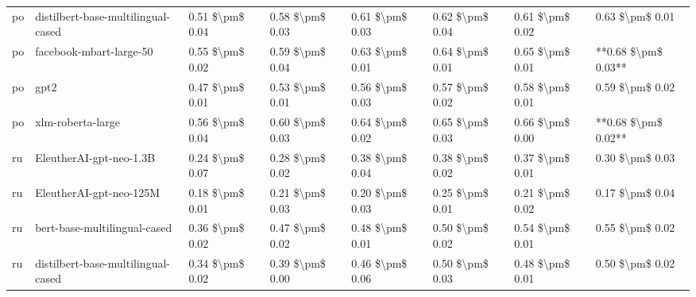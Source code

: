 \begin{tabular}{llllllll}
      po & distilbert-base-multilingual-cased & 0.51 \$\textbackslash pm\$ 0.04 &           0.58 \$\textbackslash pm\$ 0.03 &       0.61 \$\textbackslash pm\$ 0.03 &        0.62 \$\textbackslash pm\$ 0.04 &                         0.61 \$\textbackslash pm\$ 0.02 &     0.63 \$\textbackslash pm\$ 0.01 \\
      po &            facebook-mbart-large-50 & 0.55 \$\textbackslash pm\$ 0.02 &           0.59 \$\textbackslash pm\$ 0.04 &       0.63 \$\textbackslash pm\$ 0.01 &        0.64 \$\textbackslash pm\$ 0.01 &                         0.65 \$\textbackslash pm\$ 0.01 & **0.68 \$\textbackslash pm\$ 0.03** \\
      po &                               gpt2 & 0.47 \$\textbackslash pm\$ 0.01 &           0.53 \$\textbackslash pm\$ 0.01 &       0.56 \$\textbackslash pm\$ 0.03 &        0.57 \$\textbackslash pm\$ 0.02 &                         0.58 \$\textbackslash pm\$ 0.01 &     0.59 \$\textbackslash pm\$ 0.02 \\
      po &                  xlm-roberta-large & 0.56 \$\textbackslash pm\$ 0.04 &           0.60 \$\textbackslash pm\$ 0.03 &       0.64 \$\textbackslash pm\$ 0.02 &        0.65 \$\textbackslash pm\$ 0.03 &                         0.66 \$\textbackslash pm\$ 0.00 & **0.68 \$\textbackslash pm\$ 0.02** \\
      ru &            EleutherAI-gpt-neo-1.3B & 0.24 \$\textbackslash pm\$ 0.07 &           0.28 \$\textbackslash pm\$ 0.02 &       0.38 \$\textbackslash pm\$ 0.04 &        0.38 \$\textbackslash pm\$ 0.02 &                         0.37 \$\textbackslash pm\$ 0.01 &     0.30 \$\textbackslash pm\$ 0.03 \\
      ru &            EleutherAI-gpt-neo-125M & 0.18 \$\textbackslash pm\$ 0.01 &           0.21 \$\textbackslash pm\$ 0.03 &       0.20 \$\textbackslash pm\$ 0.03 &        0.25 \$\textbackslash pm\$ 0.01 &                         0.21 \$\textbackslash pm\$ 0.02 &     0.17 \$\textbackslash pm\$ 0.04 \\
      ru &       bert-base-multilingual-cased & 0.36 \$\textbackslash pm\$ 0.02 &           0.47 \$\textbackslash pm\$ 0.02 &       0.48 \$\textbackslash pm\$ 0.01 &        0.50 \$\textbackslash pm\$ 0.02 &                         0.54 \$\textbackslash pm\$ 0.01 &     0.55 \$\textbackslash pm\$ 0.02 \\
      ru & distilbert-base-multilingual-cased & 0.34 \$\textbackslash pm\$ 0.02 &           0.39 \$\textbackslash pm\$ 0.00 &       0.46 \$\textbackslash pm\$ 0.06 &        0.50 \$\textbackslash pm\$ 0.03 &                         0.48 \$\textbackslash pm\$ 0.01 &     0.50 \$\textbackslash pm\$ 0.02 \\

\end{tabular}

